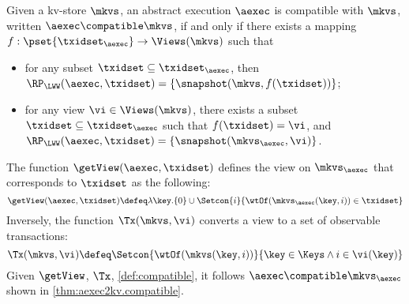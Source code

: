\begin{definition}
\label{def:compatible}
Given a kv-store $\mkvs$,
an abstract execution $\aexec$ is compatible with $\mkvs$, written 
$\aexec \compatible \mkvs$, if and only if there exists a  mapping 
$f: \pset{\txidset_{\aexec}} \rightarrow \Views(\mkvs)$
such that  
\begin{itemize}
\item for any subset $\txidset \subseteq \txidset_{\aexec}$, then $\RP_{\LWW}(\aexec, \txidset) = \{\snapshot(\mkvs, f(\txidset))\}$; 
\item for any view $\vi \in \Views(\mkvs)$, there exists a subset $\txidset \subseteq \txidset_{\aexec}$ 
such that $f(\txidset) = \vi$, and $\RP_{\LWW}(\aexec, \txidset) = \{\snapshot(\mkvs_{\aexec}, \vi)\}$.
\end{itemize}
\end{definition}

The function $\getView(\aexec, \txidset)$ defines the view on \( \mkvs_\aexec \) that corresponds to \( \txidset \) as the following:
\[
    \getView(\aexec, \txidset) \defeq \lambda \key. \{0\} \cup \Setcon{ i }{\wtOf(\mkvs_{\aexec}(\key, i)) \in \txidset}
\]
Inversely, the function \( \Tx(\mkvs, \vi) \) converts a view to a set of observable transactions:
\[
\Tx(\mkvs, \vi) \defeq \Setcon{ \wtOf(\mkvs(\key, i)) }{ \key \in \Keys \wedge i \in \vi(\key) }
\]
Given \( \getView \), \( \Tx \), \cref{def:compatible}, 
it follows \( \aexec \compatible \mkvs_{\aexec} \) shown in \cref{thm:aexec2kv.compatible}.

